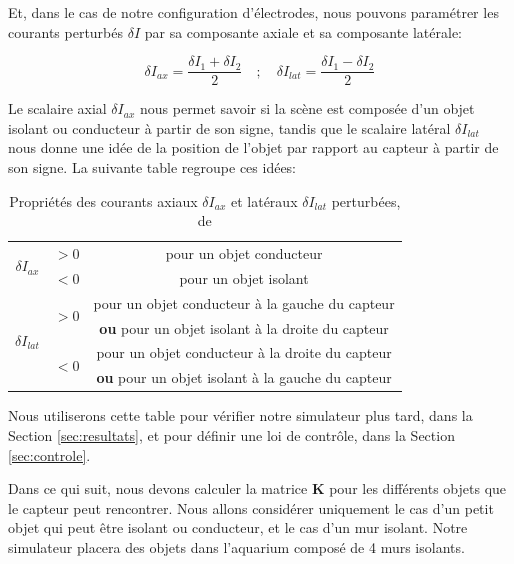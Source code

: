 Et, dans le cas de notre configuration d'électrodes, nous pouvons paramétrer les courants perturbés $\delta I$ par sa composante axiale et sa composante latérale: 

\begin{equation}\label{eq:axial_lateral}
    \delta I_{ax} = \frac{\delta I_1 + \delta I_2}{2} \quad ; \quad \delta I_{lat} = \frac{\delta I_1 - \delta I_2}{2}
\end{equation}

Le scalaire axial $\delta I_{ax}$ nous permet savoir si la scène est composée d'un objet isolant ou conducteur à partir de son signe, tandis que le scalaire latéral $\delta I_{lat}$ nous donne une idée de la position de l'objet par rapport au capteur à partir de son signe. La suivante table regroupe ces idées: 

\begin{table}[h!]
    \centering
    \begin{tabular}{|c|c|c|}
        \hline
        \multirow{2}{*}{$\delta I_{ax}$} & $>0$ & pour un objet conducteur\\ \cline{2-3}
         & $<0$& pour un objet isolant \\
         \hline
         \multirow{4}{*}{$\delta I_{lat}$} & \multirow{2}{*}{$>0$} & pour un objet conducteur à la gauche du capteur \\
          & & \textbf{ou} pour un objet isolant à la droite du capteur \\ \cline{2-3}
          & \multirow{2}{*}{$<0$} & pour un objet conducteur à la droite du capteur \\
          & & \textbf{ou} pour un objet isolant à la gauche du capteur \\
          \hline
    \end{tabular}
    \caption{\centering Propriétés des courants axiaux $\delta I_{ax}$ et latéraux $\delta I_{lat}$ perturbées, de \cite{Boyer2013}}
    \label{tab:proprietes}
\end{table}

Nous utiliserons cette table pour vérifier notre simulateur plus tard, dans la Section \ref{sec:resultats}, et pour définir une loi de contrôle, dans la Section \ref{sec:controle}.

Dans ce qui suit, nous devons calculer la matrice $\mathbf{K}$ pour les différents objets que le capteur peut rencontrer. Nous allons considérer uniquement le cas d'un petit objet qui peut être isolant ou conducteur, et le cas d'un mur isolant. Notre simulateur placera des objets dans l'aquarium composé de 4 murs isolants. 

